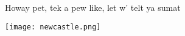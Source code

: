 
\begin{quip} 

Howay pet, tek a pew like, let w' telt ya sumat

\vfill

\texttt{[image: newcastle.png]}

\end{quip}
